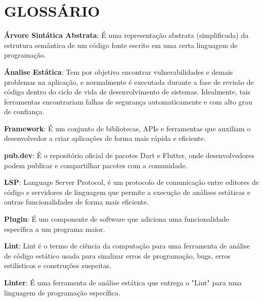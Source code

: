 



\chapter*{GLOSSÁRIO}

{ \setlength{\parindent}{0pt} %

\textbf{Árvore Sintática Abstrata}: É uma representação abstrata (simplificada) da estrutura semântica de um código fonte escrito em uma certa linguagem de programação.

\textbf{Ánalise Estática}: Tem por objetivo encontrar vulnerabilidades e demais problemas na aplicação, e normalmente é executada durante a fase de revisão de código dentro do ciclo de vida de desenvolvimento de sistemas. Idealmente, tais ferramentas encontrariam falhas de segurança automaticamente e com alto grau de confiança.

\textbf{Framework}: É um conjunto de bibliotecas, APIs e ferramentas que auxiliam o desenvolvedor a criar aplicações de forma mais rápida e eficiente.

\textbf{pub.dev}: É o repositório oficial de pacotes Dart e Flutter, onde desenvolvedores podem publicar e compartilhar pacotes com a comunidade.

\textbf{LSP}: Language Server Protocol, é um protocolo de comunicação entre editores de código e servidores de linguagem que permite a execução de análises estáticas e outras funcionalidades de forma mais eficiente.

\textbf{Plugin}: É um componente de software que adiciona uma funcionalidade específica a um programa maior.

\textbf{Lint}: Lint é o termo de ciência da computação para uma ferramenta de análise de código estático usada para sinalizar erros de programação, bugs, erros estilísticos e construções suspeitas.

\textbf{Linter}: É uma ferramenta de análise estática que entrega o "Lint" para uma linguagem de programação específica.

} %
